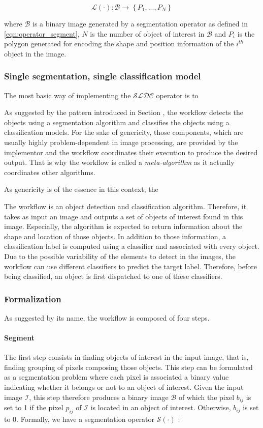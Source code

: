 \begin{equation}
	\mathcal{L}(\cdot) : \mathcal{B} \rightarrow \left\{P_1, ..., P_N\right\}
\end{equation}

where $\mathcal{B}$ is a binary image generated by a segmentation operator as defined in \ref{eqn:operator_segment}, $N$ is the number of object of interest in $\mathcal{B}$ and $P_i$ is the polygon generated for encoding the shape and position information of the $i^{th}$ object in the image.


\subsubsection{Single segmentation, single classification model}

The most basic way of implementing the $\mathcal{SLDC}$ operator is to 

As suggested by the pattern introduced in Section , the workflow detects the objects using a segmentation algorithm and classifies the objects using a classification models. For the sake of genericity, those components, which are usually highly problem-dependent in image processing, are provided by the implementor and the workflow coordinates their execution to produce the desired output. That is why the workflow is called a \textit{meta-algorithm} as it actually coordinates other algorithms.

As genericity is of the essence in this context, the 


The workflow is an object detection and classification algorithm. Therefore, it takes as input an image and outputs a set of objects of interest found in this image. Especially, the algorithm is expected to return information about the shape and location of those objects. In addition to those information, a classification label is computed using a classifier and associated with every object. Due to the possible variability of the elements to detect in the images, the workflow can use different classifiers to predict the target label. Therefore, before being classified, an object is first dispatched to one of these classifiers. 

\subsubsection{Formalization}
As suggested by its name, the workflow is composed of four steps. 

\paragraph{Segment} The first step consists in finding objects of interest in the input image, that is, finding grouping of pixels composing those objects. This step can be formulated as a segmentation problem where each pixel is associated a binary value indicating whether it belongs or not to an object of interest. Given the input image $\mathcal{I}$, this step therefore produces a binary image $\mathcal{B}$ of which the pixel $b_{ij}$ is set to 1 if the pixel $p_{ij}$ of $\mathcal{I}$ is located in an object of interest. Otherwise, $b_{ij}$ is set to 0. Formally, we have a segmentation operator $\mathcal{S}(\cdot)$ : 


